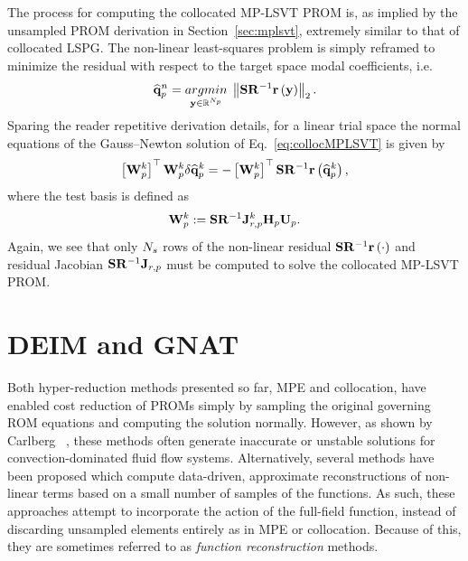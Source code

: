 The process for computing the collocated MP-LSVT PROM is, as implied by the unsampled PROM derivation in Section~\ref{sec:mplsvt}, extremely similar to that of collocated LSPG. The non-linear least-squares problem is simply reframed to minimize the residual with respect to the target space modal coefficients, i.e.
%
\begin{equation}\label{eq:collocMPLSVT}
	\primVecCoef^{\timeIdx} = \argmin{\dummyVec \inROne{\numPrimModes}} \left\Vert \sampMat \resScaleInv \resFunc{\dummyVec} \right\Vert_2.
\end{equation}
%
Sparing the reader repetitive derivation details, for a linear trial space the normal equations of the Gauss--Newton solution of Eq.~\ref{eq:collocMPLSVT} is given by
%
\begin{equation}
    \left[\testBasisPrim^{\newtonIdx}\right]^\top \testBasisPrim^{\newtonIdx} \delta \primVecCoef^{\newtonIdx} = -\left[\testBasisPrim^{\newtonIdx}\right]^\top \sampMat \resScaleInv \resFunc{\primVecCoef^{\newtonIdx}},
\end{equation}
%
where the test basis is defined as
%
\begin{equation}
    \testBasisPrim^\newtonIdx \defEq \sampMat \resScaleInv \jacobResPrim^\newtonIdx \primScale \primTrial.
\end{equation}
%
Again, we see that only $N_s$ rows of the non-linear residual $\sampMat \resScaleInv \resFunc{\cdot}$ and residual Jacobian $\sampMat \resScaleInv \jacobResPrim$ must be computed to solve the collocated MP-LSVT PROM.

\section{DEIM and GNAT}\label{subsec:gappyPOD}
%
Both hyper-reduction methods presented so far, MPE and collocation, have enabled cost reduction of PROMs simply by sampling the original governing ROM equations and computing the solution normally. However, as shown by Carlberg ~\cite{Carlberg2013}, these methods often generate inaccurate or unstable solutions for convection-dominated fluid flow systems. Alternatively, several methods have been proposed which compute data-driven, approximate reconstructions of non-linear terms based on a small number of samples of the functions. As such, these approaches attempt to incorporate the action of the full-field function, instead of discarding unsampled elements entirely as in MPE or collocation. Because of this, they are sometimes referred to as \textit{function reconstruction} methods.

